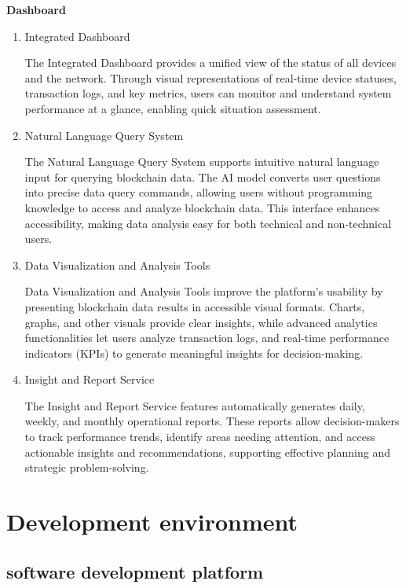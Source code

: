 \documentclass[conference]{IEEEtran}
\begin{document}
	{\centering \textbf{Dashboard} \par}
	\begin{enumerate}[itemsep=2ex, parsep=1ex]
		\item Integrated Dashboard

			The Integrated Dashboard provides a unified view of the status of all
			devices and the network. Through visual representations of real-time device
			statuses, transaction logs, and key metrics, users can monitor and
			understand system performance at a glance, enabling quick situation assessment.

		\item Natural Language Query System

			The Natural Language Query System supports intuitive natural language
			input for querying blockchain data. The AI model converts user questions into
			precise data query commands, allowing users without programming knowledge
			to access and analyze blockchain data. This interface enhances accessibility,
			making data analysis easy for both technical and non-technical users.

		\item Data Visualization and Analysis Tools

			Data Visualization and Analysis Tools improve the platform’s usability by
			presenting blockchain data results in accessible visual formats. Charts,
			graphs, and other visuals provide clear insights, while advanced analytics
			functionalities let users analyze transaction logs, and real-time performance
			indicators (KPIs) to generate meaningful insights for decision-making.

		\item Insight and Report Service

			The Insight and Report Service features automatically generates daily, weekly,
			and monthly operational reports. These reports allow decision-makers to track
			performance trends, identify areas needing attention, and access actionable
			insights and recommendations, supporting effective planning and strategic
			problem-solving.
	\end{enumerate}

	\section{Development environment}

	\subsection{software development platform}
\end{document}
